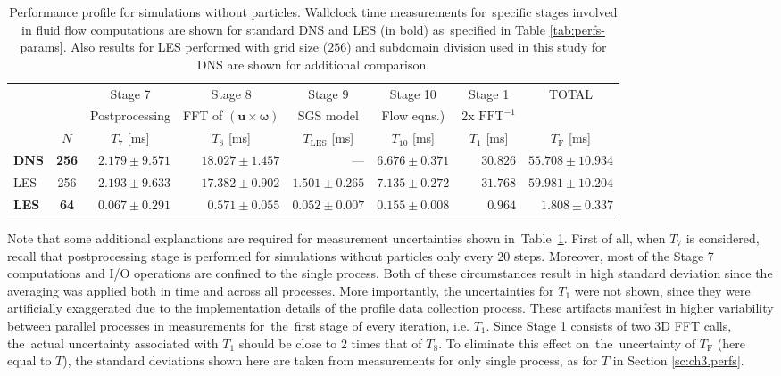 \documentclass{pracamgren}
\begin{document}
\begin{table}[h]
\centering
\scriptsize
\begin{tabular}{lcrrrrrr}
& & \multicolumn{1}{c}{Stage 7} &  \multicolumn{1}{c}{Stage 8} & \multicolumn{1}{c}{Stage 9} & \multicolumn{1}{c}{Stage 10} &  \multicolumn{1}{c}{Stage 1} & \multicolumn{1}{c}{TOTAL} \\
& & \multicolumn{1}{c}{Postprocessing} &  \multicolumn{1}{c}{FFT of $(\mathbf{u} \times \boldsymbol{\omega})$} &  \multicolumn{1}{c}{SGS model} &  \multicolumn{1}{c}{Flow eqns.)} & \multicolumn{1}{c}{2x $\text{FFT}^{-1}$} & \\
& $N$ & \multicolumn{1}{c}{$T_7$ [ms]} & \multicolumn{1}{c}{$T_8$ [ms]} & \multicolumn{1}{c}{$T_{\text{LES}}$ [ms]} & \multicolumn{1}{c}{$T_{10}$ [ms]} & \multicolumn{1}{c}{$T_1$ [ms]} & \multicolumn{1}{c}{$T_{\text{F}}$ [ms]} \\ \hline
\textbf{DNS} & \textbf{256} & $2.179 \pm 9.571$ & $18.027 \pm 1.457$ & --- & $6.676 \pm 0.371$ & $30.826$ & $55.708 \pm 10.934$ \\
LES & 256 & $2.193 \pm 9.633$ & $17.382 \pm 0.902$ & $1.501 \pm 0.265$ & $7.135 \pm 0.272$ & $31.768$ & $59.981 \pm 10.204$ \\
\textbf{LES} & \textbf{64} & $0.067 \pm 0.291$ & $0.571 \pm 0.055$ & $0.052 \pm 0.007$ & $0.155 \pm 0.008$ & $0.964$ & $1.808 \pm 0.337$ \\
\end{tabular}
\caption{Performance profile for simulations without particles.
Wallclock time measurements for~specific stages involved in fluid flow computations are shown for standard DNS and LES (in bold) as~specified in Table \ref{tab:perfs-params}.
Also results for LES performed with grid size ($256$) and subdomain division used in this study for DNS are shown for additional comparison.
}
\label{tab:pff-flow}
\end{table}

Note that some additional explanations are required for measurement uncertainties shown in~Table~\ref{tab:pff-flow}.
First of all, when $T_7$ is considered, recall that postprocessing stage is performed for simulations without particles only every 20 steps.
Moreover, most of the Stage 7 computations and I/O operations are confined to the single process.
Both of these circumstances result in high standard deviation since the averaging was applied both in time and across all processes.
More importantly, the uncertainties for $T_1$ were not shown, since they were artificially exaggerated due to the implementation details of the profile data collection process.
These artifacts manifest in higher variability between parallel processes in measurements for~the~first stage of every iteration, i.e. $T_1$.
Since Stage 1 consists of two 3D FFT calls, the~actual uncertainty associated with $T_1$ should be close to $2$ times that of $T_8$.
To eliminate this effect on~the~uncertainty of $T_{\text{F}}$ (here equal to $T$), the standard deviations shown here are taken from measurements for only single process, as for $T$ in Section \ref{sc:ch3.perfs}.  
\end{document}
